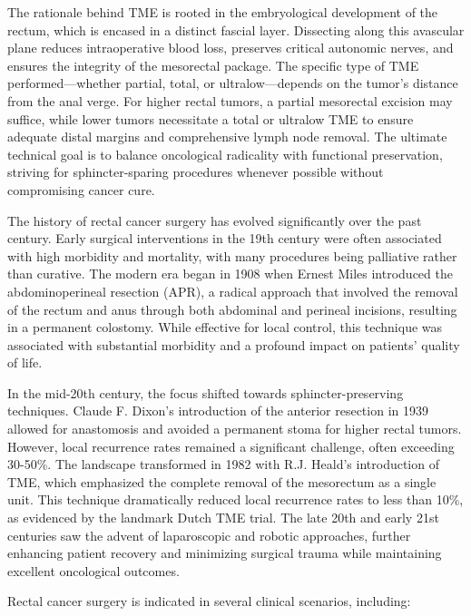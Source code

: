The rationale behind TME is rooted in the embryological development of the rectum, which is encased in a distinct fascial layer. Dissecting along this avascular plane reduces intraoperative blood loss, preserves critical autonomic nerves, and ensures the integrity of the mesorectal package. The specific type of TME performed—whether partial, total, or ultralow—depends on the tumor's distance from the anal verge. For higher rectal tumors, a partial mesorectal excision may suffice, while lower tumors necessitate a total or ultralow TME to ensure adequate distal margins and comprehensive lymph node removal. The ultimate technical goal is to balance oncological radicality with functional preservation, striving for sphincter-sparing procedures whenever possible without compromising cancer cure.

The history of rectal cancer surgery has evolved significantly over the past century. Early surgical interventions in the 19th century were often associated with high morbidity and mortality, with many procedures being palliative rather than curative. The modern era began in 1908 when Ernest Miles introduced the abdominoperineal resection (APR), a radical approach that involved the removal of the rectum and anus through both abdominal and perineal incisions, resulting in a permanent colostomy. While effective for local control, this technique was associated with substantial morbidity and a profound impact on patients' quality of life.

In the mid-20th century, the focus shifted towards sphincter-preserving techniques. Claude F. Dixon's introduction of the anterior resection in 1939 allowed for anastomosis and avoided a permanent stoma for higher rectal tumors. However, local recurrence rates remained a significant challenge, often exceeding 30-50\%. The landscape transformed in 1982 with R.J. Heald's introduction of TME, which emphasized the complete removal of the mesorectum as a single unit. This technique dramatically reduced local recurrence rates to less than 10\%, as evidenced by the landmark Dutch TME trial. The late 20th and early 21st centuries saw the advent of laparoscopic and robotic approaches, further enhancing patient recovery and minimizing surgical trauma while maintaining excellent oncological outcomes.

Rectal cancer surgery is indicated in several clinical scenarios, including:


